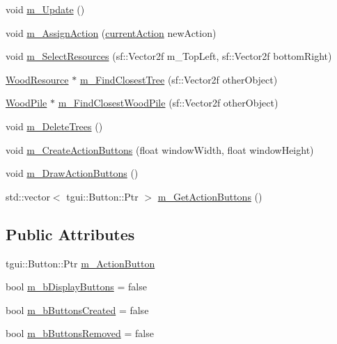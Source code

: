 \begin{DoxyCompactItemize}
\item 
void \mbox{\hyperlink{class_resource_management_a3449b35ee0c369402fd27887f34ffb2c}{m\+\_\+\+Update}} ()
\item 
void \mbox{\hyperlink{class_resource_management_adb99960558a8c45eea8b0b1acf094933}{m\+\_\+\+Assign\+Action}} (\mbox{\hyperlink{defs_8h_ac4f8c89b962f2fa93febb5519cc2b4dc}{current\+Action}} new\+Action)
\item 
void \mbox{\hyperlink{class_resource_management_a09e1fc7bf33d2dad66dfa6e479f2f438}{m\+\_\+\+Select\+Resources}} (sf\+::\+Vector2f m\+\_\+\+Top\+Left, sf\+::\+Vector2f bottom\+Right)
\item 
\mbox{\hyperlink{class_wood_resource}{Wood\+Resource}} $\ast$ \mbox{\hyperlink{class_resource_management_a41493114486fc4b7dc6ebfc472254bc1}{m\+\_\+\+Find\+Closest\+Tree}} (sf\+::\+Vector2f other\+Object)
\item 
\mbox{\hyperlink{class_wood_pile}{Wood\+Pile}} $\ast$ \mbox{\hyperlink{class_resource_management_aff320c3220c97345cab6ea74df6cd33c}{m\+\_\+\+Find\+Closest\+Wood\+Pile}} (sf\+::\+Vector2f other\+Object)
\item 
void \mbox{\hyperlink{class_resource_management_ae7084b8a6de4ef34bcf21b42abb6502c}{m\+\_\+\+Delete\+Trees}} ()
\item 
void \mbox{\hyperlink{class_resource_management_a8fb29f2219b96d39a5a38c5bbb0cf5e9}{m\+\_\+\+Create\+Action\+Buttons}} (float window\+Width, float window\+Height)
\item 
void \mbox{\hyperlink{class_resource_management_a06d9993d12174e90a257f823a4212859}{m\+\_\+\+Draw\+Action\+Buttons}} ()
\item 
std\+::vector$<$ tgui\+::\+Button\+::\+Ptr $>$ \mbox{\hyperlink{class_resource_management_a7e05e6e59df2c766bb4513630de3bd31}{m\+\_\+\+Get\+Action\+Buttons}} ()
\end{DoxyCompactItemize}
\subsection*{Public Attributes}
\begin{DoxyCompactItemize}
\item 
tgui\+::\+Button\+::\+Ptr \mbox{\hyperlink{class_resource_management_a081d6a06905b376b862c2baa74170f25}{m\+\_\+\+Action\+Button}}
\item 
bool \mbox{\hyperlink{class_resource_management_a44e194185578f2b0c63bea0e0a444b57}{m\+\_\+b\+Display\+Buttons}} = false
\item 
bool \mbox{\hyperlink{class_resource_management_ae5afb8912d93fa84581a9d7192a9fda1}{m\+\_\+b\+Buttons\+Created}} = false
\item 
bool \mbox{\hyperlink{class_resource_management_a013731a638632849d16516f3ac7250e3}{m\+\_\+b\+Buttons\+Removed}} = false
\end{DoxyCompactItemize}


